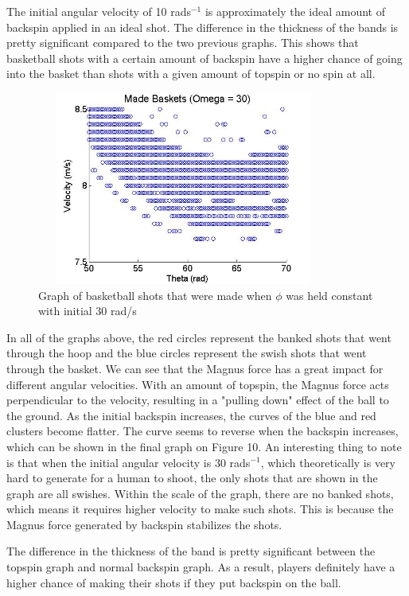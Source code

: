 \documentclass[twocolumn]{IEEEtran}
\begin{document}
The initial angular velocity of 10 rads$^{-1}$ is approximately the ideal amount of backspin applied in an ideal shot. The difference in the thickness of the bands is pretty significant compared to the two previous graphs. This shows that basketball shots with a certain amount of backspin have a higher chance of going into the basket than shots with a given amount of topspin or no spin at all.

\begin{figure}[!ht]
\includegraphics[height=2.5in,width = 3.8in]{30backspin}
\caption{Graph of basketball shots that were made when $\phi$ was held constant with initial 30 rad/s}
\end{figure}

In all of the graphs above, the red circles represent the banked shots that went through the hoop and the blue circles represent the swish shots that went through the basket. We can see that the Magnus force has a great impact for different angular velocities. With an amount of topspin, the Magnus force acts perpendicular to the velocity, resulting in a "pulling down" effect of the ball to the ground. As the initial backspin increases, the curves of the blue and red clusters become flatter. The curve seems to reverse when the backspin increases, which can be shown in the final graph on Figure 10. An interesting thing to note is that when the initial angular velocity is 30 rads$^{-1}$, which theoretically is very hard to generate for a human to shoot, the only shots that are shown in the graph are all swishes. Within the scale of the graph, there are no banked shots, which means it requires higher velocity to make such shots. This is because the Magnus force generated by backspin stabilizes the shots.

The difference in the thickness of the band is pretty significant between the topspin graph and normal backspin graph. As a result, players definitely have a higher chance of making their shots if they put backspin on the ball.
\end{document}

